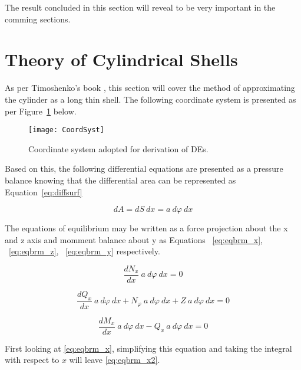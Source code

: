 The result concluded in this section will reveal to be very important in the comming sections.

\section{Theory of Cylindrical Shells}

As per Timoshenko's book \citep{timoshenko1959theory}, this section will cover the method of approximating the cylinder as a long thin shell. The following coordinate system is presented as per Figure~\ref{fig:CoordSyst} below.

\begin{figure}[!htbp]
	\centering
	\texttt{[image: CoordSyst]}
	\caption{Coordinate system adopted for derivation of DEs.}
	\label{fig:CoordSyst}
\end{figure}

Based on this, the following differential equations are presented as a pressure balance knowing that the differential area can be represented as Equation~\ref{eq:diffsurf}
 
\begin{equation}
	\label{eq:diffsurf}
	dA = dS\ dx = a\ d\varphi \ dx   
\end{equation}

The equations of equilibrium may be written as a force projection about the x and z axis and momment balance about y as Equations ~\ref{eq:eqbrm_x}, ~\ref{eq:eqbrm_z}, ~\ref{eq:eqbrm_y} respectively.

\begin{equation}
	\label{eq:eqbrm_x}
	\frac{dN_x}{dx}\ a\ d\varphi \ dx = 0
\end{equation}

\begin{equation}
	\label{eq:eqbrm_z}
	\frac{dQ_x}{dx}\ a\ d\varphi \ dx+ N_\varphi \ a\ d\varphi \ dx +Z\ a\ d\varphi \ dx= 0
\end{equation}

\begin{equation}
	\label{eq:eqbrm_y}
	\frac{dM_x}{dx}\ a\ d\varphi \ dx- Q_x\ a\ d\varphi \ dx= 0
\end{equation}

First looking at \ref{eq:eqbrm_x}, simplifying this equation and taking the integral with respect to $x$ will leave \ref{eq:eqbrm_x2}. 

